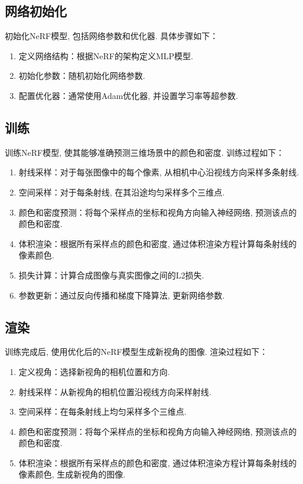 \documentclass[notitlepage,cs4size,punct,oneside]{ctexrep}
\numberwithin{equation}{chapter}
\theoremstyle{mystyle}
\begin{document}
\subsection{网络初始化}
初始化NeRF模型, 包括网络参数和优化器. 具体步骤如下：
\begin{enumerate}
    \item 定义网络结构：根据NeRF的架构定义MLP模型.
    \item 初始化参数：随机初始化网络参数.
    \item 配置优化器：通常使用Adam优化器, 并设置学习率等超参数.
\end{enumerate}

\subsection{训练}
训练NeRF模型, 使其能够准确预测三维场景中的颜色和密度. 训练过程如下：
\begin{enumerate}
    \item 射线采样：对于每张图像中的每个像素, 从相机中心沿视线方向采样多条射线.
    \item 空间采样：对于每条射线, 在其沿途均匀采样多个三维点.
    \item 颜色和密度预测：将每个采样点的坐标和视角方向输入神经网络, 预测该点的颜色和密度.
    \item 体积渲染：根据所有采样点的颜色和密度, 通过体积渲染方程计算每条射线的像素颜色.
    \item 损失计算：计算合成图像与真实图像之间的L2损失.
    \item 参数更新：通过反向传播和梯度下降算法, 更新网络参数.
\end{enumerate}
\subsection{渲染}
训练完成后, 使用优化后的NeRF模型生成新视角的图像. 渲染过程如下：
\begin{enumerate}
    \item 定义视角：选择新视角的相机位置和方向.
    \item 射线采样：从新视角的相机位置沿视线方向采样射线.
    \item 空间采样：在每条射线上均匀采样多个三维点.
    \item 颜色和密度预测：将每个采样点的坐标和视角方向输入神经网络, 预测该点的颜色和密度.
    \item 体积渲染：根据所有采样点的颜色和密度, 通过体积渲染方程计算每条射线的像素颜色, 生成新视角的图像.
\end{enumerate}
\end{document}
